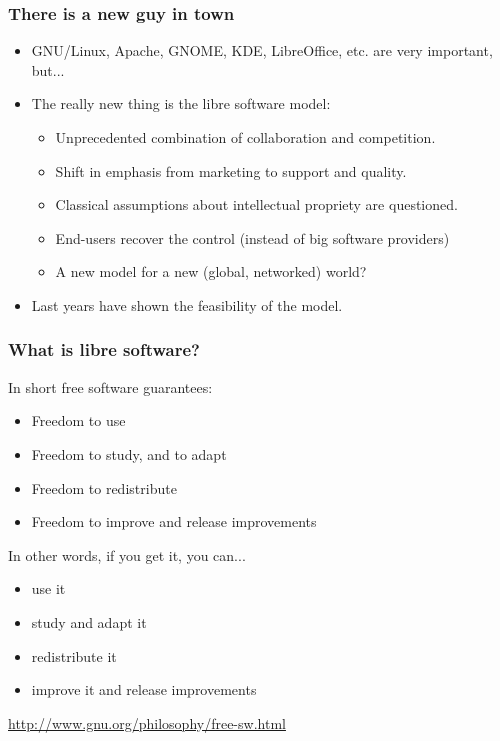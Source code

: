 \documentclass{beamer}
\begin{document}
\begin{frame}
\frametitle{There is a new guy in town}

\begin{itemize}
\item GNU/Linux, Apache, GNOME, KDE, LibreOffice, etc. are very
  important, but...
\item The really new thing is the libre software model:
  \begin{itemize}
  \item Unprecedented combination of collaboration and competition.
  \item Shift in emphasis from marketing to support and quality.
  \item Classical assumptions about intellectual propriety are
    questioned.
  \item End-users recover the control (instead of big software providers)
  \item A new model for a new (global, networked) world?
  \end{itemize}
\item Last years have shown the feasibility of the model.
\end{itemize}

\end{frame}



\begin{frame}
\frametitle{What is libre software?}

In short free software guarantees:

\begin{itemize}
\item Freedom to use
\item Freedom to study, and to adapt
\item Freedom to redistribute
\item Freedom to improve and release improvements
\end{itemize}

In other words, if you get it, you can...

\begin{itemize}
\item use it
\item study and adapt it
\item redistribute it
\item improve it and release improvements
\end{itemize}
\vspace{.2cm}
\begin{flushright}
\url{http://www.gnu.org/philosophy/free-sw.html}
\end{flushright}

\end{frame}
\end{document}
